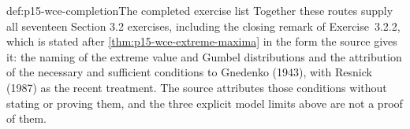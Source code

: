 \begin{proofboundary}{def:p15-wce-completion}{The completed exercise list}
Together these routes supply all seventeen Section 3.2 exercises,
including the closing remark of Exercise~3.2.2, which is stated
after \cref{thm:p15-wce-extreme-maxima} in the form the source gives
it: the naming of the extreme value and Gumbel distributions and the
attribution of the necessary and sufficient conditions to Gnedenko
(1943), with Resnick (1987) as the recent treatment. The source
attributes those conditions without stating or proving them, and the
three explicit model limits above are not a proof of them.
\end{proofboundary}
